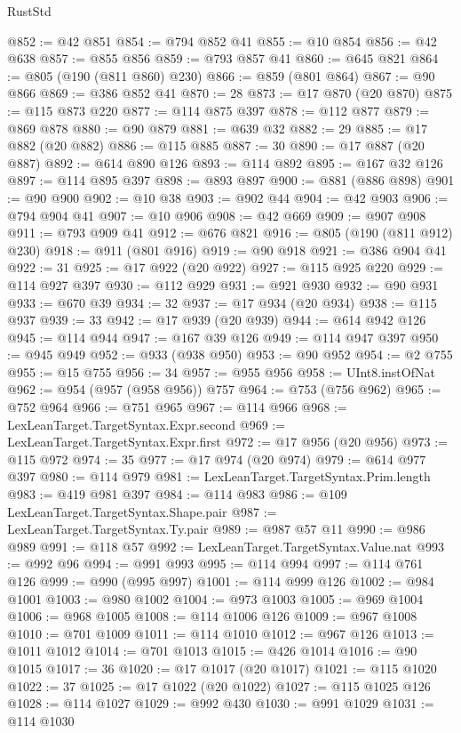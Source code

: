 \begin{lexlean}{RustStd}
\begin{coremodule}
{\begin{coremodule}
{{{{{{{{{{{{{{{{{{{{{{{{{{{{{{{{{{{{{{{{{{{{{{{{{{@852 := @42 @851
@854 := @794 @852 @41
@855 := @10 @854
@856 := @42 @638
@857 := @855 @856
@859 := @793 @857 @41
@860 := @645 @821
@864 := @805 (@190 (@811 @860) @230)
@866 := @859 (@801 @864)
@867 := @90 @866
@869 := @386 @852 @41
@870 := 28
@873 := @17 @870 (@20 @870)
@875 := @115 @873 @220
@877 := @114 @875 @397
@878 := @112 @877
@879 := @869 @878
@880 := @90 @879
@881 := @639 @32
@882 := 29
@885 := @17 @882 (@20 @882)
@886 := @115 @885
@887 := 30
@890 := @17 @887 (@20 @887)
@892 := @614 @890 @126
@893 := @114 @892
@895 := @167 @32 @126
@897 := @114 @895 @397
@898 := @893 @897
@900 := @881 (@886 @898)
@901 := @90 @900
@902 := @10 @38
@903 := @902 @44
@904 := @42 @903
@906 := @794 @904 @41
@907 := @10 @906
@908 := @42 @669
@909 := @907 @908
@911 := @793 @909 @41
@912 := @676 @821
@916 := @805 (@190 (@811 @912) @230)
@918 := @911 (@801 @916)
@919 := @90 @918
@921 := @386 @904 @41
@922 := 31
@925 := @17 @922 (@20 @922)
@927 := @115 @925 @220
@929 := @114 @927 @397
@930 := @112 @929
@931 := @921 @930
@932 := @90 @931
@933 := @670 @39
@934 := 32
@937 := @17 @934 (@20 @934)
@938 := @115 @937
@939 := 33
@942 := @17 @939 (@20 @939)
@944 := @614 @942 @126
@945 := @114 @944
@947 := @167 @39 @126
@949 := @114 @947 @397
@950 := @945 @949
@952 := @933 (@938 @950)
@953 := @90 @952
@954 := @2 @755
@955 := @15 @755
@956 := 34
@957 := @955 @956
@958 := UInt8.instOfNat
@962 := @954 (@957 (@958 @956)) @757
@964 := @753 (@756 @962)
@965 := @752 @964
@966 := @751 @965
@967 := @114 @966
@968 := LexLeanTarget.TargetSyntax.Expr.second
@969 := LexLeanTarget.TargetSyntax.Expr.first
@972 := @17 @956 (@20 @956)
@973 := @115 @972
@974 := 35
@977 := @17 @974 (@20 @974)
@979 := @614 @977 @397
@980 := @114 @979
@981 := LexLeanTarget.TargetSyntax.Prim.length
@983 := @419 @981 @397
@984 := @114 @983
@986 := @109 LexLeanTarget.TargetSyntax.Shape.pair
@987 := LexLeanTarget.TargetSyntax.Ty.pair
@989 := @987 @57 @11
@990 := @986 @989
@991 := @118 @57
@992 := LexLeanTarget.TargetSyntax.Value.nat
@993 := @992 @96
@994 := @991 @993
@995 := @114 @994
@997 := @114 @761 @126
@999 := @990 (@995 @997)
@1001 := @114 @999 @126
@1002 := @984 @1001
@1003 := @980 @1002
@1004 := @973 @1003
@1005 := @969 @1004
@1006 := @968 @1005
@1008 := @114 @1006 @126
@1009 := @967 @1008
@1010 := @701 @1009
@1011 := @114 @1010
@1012 := @967 @126
@1013 := @1011 @1012
@1014 := @701 @1013
@1015 := @426 @1014
@1016 := @90 @1015
@1017 := 36
@1020 := @17 @1017 (@20 @1017)
@1021 := @115 @1020
@1022 := 37
@1025 := @17 @1022 (@20 @1022)
@1027 := @115 @1025 @126
@1028 := @114 @1027
@1029 := @992 @430
@1030 := @991 @1029
@1031 := @114 @1030
}}}}}}}}}}}}}}}}}}}}}}}}}}}}}}}}}}}}}}}}}}}}}}}}}}
\end{coremodule}}
\end{coremodule}
\end{lexlean}

